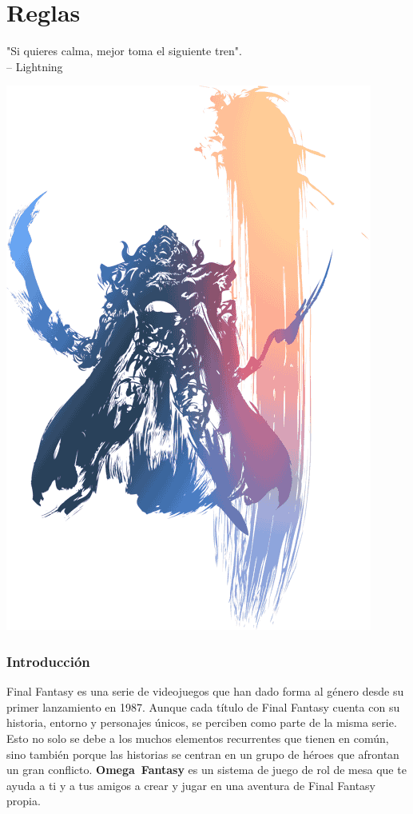 \section*{\hypertarget{gameplay}{Reglas}}
"Si quieres calma, mejor toma el siguiente tren".\\
\indent -- Lightning

\begin{center} \includegraphics[width=\columnwidth]{./art/images/ff12.png} \end{center}


\subsubsection*{Introducción}
Final Fantasy es una serie de videojuegos que han dado forma al género desde su primer lanzamiento en 1987. Aunque cada título de Final Fantasy cuenta con su historia, entorno y personajes únicos, se perciben como parte de la misma serie. Esto no solo se debe a los muchos elementos recurrentes que tienen en común, sino también porque las historias se centran en un grupo de héroes que afrontan un gran conflicto. \mbox{\textbf{Omega Fantasy}} es un sistema de juego de rol de mesa que te ayuda a ti y a tus amigos a crear y jugar en una aventura de Final Fantasy propia.

